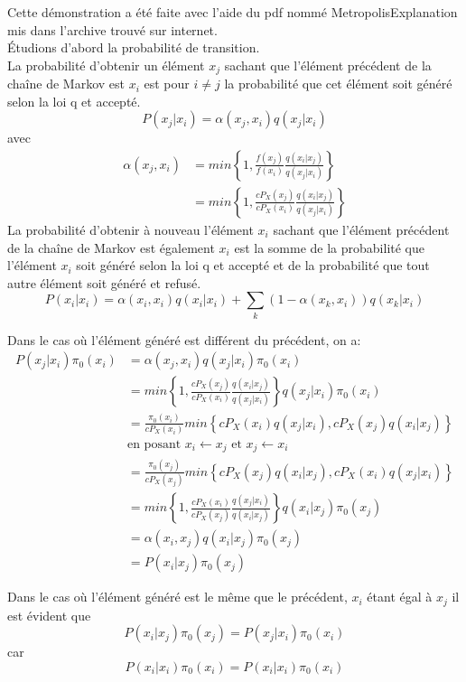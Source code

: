 \documentclass[11pt]{report}
\begin{document}
\subsubsection{}
Cette démonstration a été faite avec l'aide du pdf nommé MetropolisExplanation mis dans l'archive trouvé sur internet.\\
Étudions d'abord la probabilité de transition.\\
La probabilité d'obtenir un élément $x_j$ sachant que l'élément précédent de la chaîne de Markov est $x_i$ est pour $i \neq j$ la probabilité que cet élément soit généré selon la loi q et accepté.
$$P(x_j | x_i) = \alpha(x_j, x_i) q(x_j| x_i)$$
avec
\begin{align*}
\alpha(x_j, x_i) 
&= min \left\{1, \frac{f(x_j)}{f(x_i)} \frac{q(x_i|x_j)}{q(x_j|x_i)}\right\}\\
&= min \left\{1, \frac{cP_X(x_j)}{cP_X(x_i)} \frac{q(x_i|x_j)}{q(x_j|x_i)}\right\}
\end{align*}
La probabilité d'obtenir à nouveau l'élément $x_i$ sachant que l'élément précédent de la chaîne de Markov est également $x_i$ est la somme de la probabilité que l'élément $x_i$ soit généré selon la loi q et accepté et de la probabilité que tout autre élément soit généré et refusé.
$$P(x_i | x_i) = \alpha(x_i, x_i) q(x_i|x_i) + \sum_k (1-\alpha(x_k, x_i)) q(x_k |x_i)$$

Dans le cas où l'élément généré est différent du précédent, on a:
\begin{align*}
P(x_j | x_i) \pi_0(x_i)
&= \alpha(x_j, x_i) q(x_j| x_i) \pi_0(x_i) \\
&= min \left\{1, \frac{cP_X(x_j)}{cP_X(x_i)} \frac{q(x_i|x_j)}{q(x_j|x_i)}\right\} q(x_j| x_i) \pi_0(x_i) \\
&= \frac{\pi_0(x_i)}{cP_X(x_i)} min \left\{cP_X(x_i) q(x_j|x_i), cP_X(x_j) q(x_i|x_j)\right\} \\
&\text{en posant } x_i \leftarrow x_j \text{ et } x_j \leftarrow x_i \\
&= \frac{\pi_0(x_j)}{cP_X(x_j)} min \left\{cP_X(x_j) q(x_i|x_j), cP_X(x_i) q(x_j|x_i)\right\} \\
&= min \left\{1, \frac{cP_X(x_i)}{cP_X(x_j)} \frac{q(x_j|x_i)}{q(x_i|x_j)}\right\} q(x_i| x_j) \pi_0(x_j)\\
&= \alpha(x_i, x_j) q(x_i| x_j) \pi_0(x_j) \\
&= P(x_i | x_j) \pi_0(x_j)
\end{align*} 

Dans le cas où l'élément généré est le même que le précédent, $x_i$ étant égal à $x_j$ il est évident que 
$$P(x_i | x_j) \pi_0(x_j) = P(x_j | x_i) \pi_0(x_i)$$
car 
$$P(x_i | x_i) \pi_0(x_i) = P(x_i | x_i) \pi_0(x_i)$$
\end{document}
